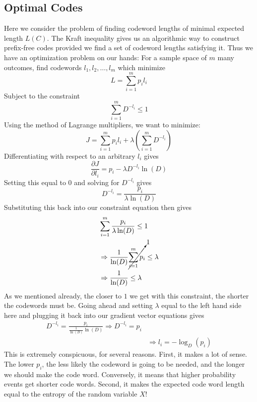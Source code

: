 \subsection{Optimal Codes}
Here we consider the problem of finding codeword lengths of minimal expected length $L(C)$. The Kraft inequality gives us an algorithmic way to construct prefix-free codes provided we find a set of codeword lengths satisfying it. Thus we have an optimization problem on our hands: For a sample space of $m$ many outcomes, find codewords $l_1,l_2,\ldots,l_m$ which minimize
\begin{equation}
    L = \sum_{i=1}^m p_i l_i 
\end{equation}
Subject to the constraint
\begin{equation}
    \sum_{i=1}^m D^{-l_i} \leq 1
\end{equation}
Using the method of Lagrange multipliers, we want to minimize:
\begin{equation}
    J = \sum_{i=1}^m p_il_i + \lambda\left(\sum_{i=1}^m D^{-l_i}\right)
\end{equation}
Differentiating with respect to an arbitrary $l_i$ gives 
\begin{equation}
    \frac{\partial J}{\partial l_i} = p_i - \lambda D^{-l_i}\ln(D)
\end{equation}
Setting this equal to $0$ and solving for $D^{-l_i}$ gives
\begin{equation}
    D^{-l_i} = \frac{p_i}{\lambda \ln(D)}
\end{equation}
Substituting this back into our constraint equation then gives
\begin{align}
    &\sum_{i=1}^m \frac{p_i}{\lambda \ln(D)} \leq 1 \\
    &\Rightarrow \frac{1}{\ln(D)}\cancelto{1}{\sum_{i=1}^m p_i} \leq \lambda \\
    &\Rightarrow \frac{1}{\ln(D)} \leq \lambda
\end{align}
As we mentioned already, the closer to $1$ we get with this constraint, the shorter the codewords must be. Going ahead and setting $\lambda$ equal to the left hand side here and plugging it back into our gradient vector equations gives
\begin{align}
    D^{-l_i} = \frac{p_i}{\frac{1}{\ln(D)}\ln(D)} \Rightarrow D^{-l_i} = p_i \\
    &\Rightarrow l_i = -\log_D(p_i)
\end{align}
This is extremely conspicuous, for several reasons. First, it makes a lot of sense. The lower $p_i$, the less likely the codeword is going to be needed, and the longer we should make the code word. Conversely, it means that higher probability events get shorter code words. Second, it makes the expected code word length equal to the entropy of the random variable $X$!
